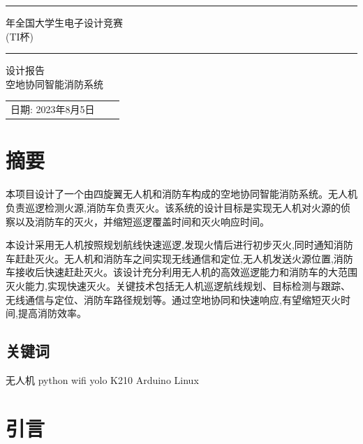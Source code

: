 \documentclass[12pt, a4paper, oneside]{article}
\begin{document}
\begin{center}
    \rule{\textwidth}{1pt}\par
    \vspace{5mm}
    {\fontsize{25pt}{30} 年全国大学生电子设计竞赛}\\[\baselineskip]
    \fontsize{25pt}{30}\selectfont (TI杯)
    \rule{\textwidth}{1pt}\par
    \vspace{4cm}
    {\fontsize{25pt}{30}\selectfont 设计报告}\\[\baselineskip]

    {\fontsize{25pt}{30}\selectfont 空地协同智能消防系统}\\[\baselineskip]
\end{center}
\vspace{2cm}

\begin{tabular}{lll}

    日期: {2023年8月5日}
\end{tabular}

\newpage
\tableofcontents

\newpage

\section{摘要}

本项目设计了一个由四旋翼无人机和消防车构成的空地协同智能消防系统。无人机负责巡逻检测火源,消防车负责灭火。该系统的设计目标是实现无人机对火源的侦察以及消防车的灭火，并缩短巡逻覆盖时间和灭火响应时间。

本设计采用无人机按照规划航线快速巡逻,发现火情后进行初步灭火,同时通知消防车赶赴灭火。无人机和消防车之间实现无线通信和定位,无人机发送火源位置,消防车接收后快速赶赴灭火。该设计充分利用无人机的高效巡逻能力和消防车的大范围灭火能力,实现快速灭火。关键技术包括无人机巡逻航线规划、目标检测与跟踪、无线通信与定位、消防车路径规划等。通过空地协同和快速响应,有望缩短灭火时间,提高消防效率。

\subsection{关键词}

无人机 python wifi yolo K210 Arduino Linux

\newpage
\section{引言}
\end{document}
